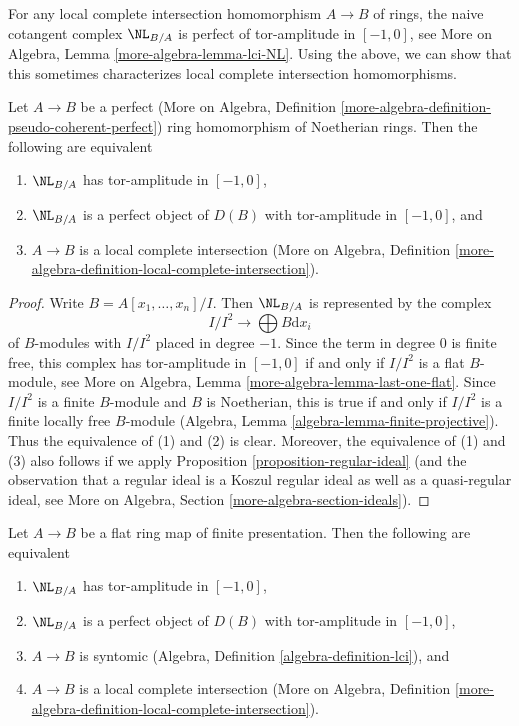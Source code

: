 \noindent
For any local complete intersection homomorphism $A \to B$
of rings, the naive cotangent complex $\NL_{B/A}$ is perfect
of tor-amplitude in $[-1, 0]$, see
More on Algebra, Lemma \ref{more-algebra-lemma-lci-NL}.
Using the above, we can show that this sometimes
characterizes local complete intersection homomorphisms.

\begin{lemma}
\label{lemma-perfect-NL-lci}
Let $A \to B$ be a perfect (More on Algebra, Definition
\ref{more-algebra-definition-pseudo-coherent-perfect})
ring homomorphism of Noetherian rings. Then the following are equivalent
\begin{enumerate}
\item $\NL_{B/A}$ has tor-amplitude in $[-1, 0]$,
\item $\NL_{B/A}$ is a perfect object of $D(B)$
with tor-amplitude in $[-1, 0]$, and
\item $A \to B$ is a local complete intersection
(More on Algebra, Definition
\ref{more-algebra-definition-local-complete-intersection}).
\end{enumerate}
\end{lemma}

\begin{proof}
Write $B = A[x_1, \ldots, x_n]/I$. Then $\NL_{B/A}$ is represented by
the complex
$$
I/I^2 \longrightarrow \bigoplus B \text{d}x_i
$$
of $B$-modules with $I/I^2$ placed in degree $-1$. Since the term in
degree $0$ is finite free, this complex has tor-amplitude in $[-1, 0]$ if and
only if $I/I^2$ is a flat $B$-module, see
More on Algebra, Lemma \ref{more-algebra-lemma-last-one-flat}.
Since $I/I^2$ is a finite $B$-module and $B$ is Noetherian, this is true
if and only if $I/I^2$ is a finite locally free $B$-module
(Algebra, Lemma \ref{algebra-lemma-finite-projective}).
Thus the equivalence of (1) and (2) is clear. Moreover, the equivalence
of (1) and (3) also follows if we apply
Proposition \ref{proposition-regular-ideal}
(and the observation that a regular ideal is a Koszul regular
ideal as well as a quasi-regular ideal, see
More on Algebra, Section \ref{more-algebra-section-ideals}).
\end{proof}

\begin{lemma}
\label{lemma-flat-fp-NL-lci}
Let $A \to B$ be a flat ring map of finite presentation.
Then the following are equivalent
\begin{enumerate}
\item $\NL_{B/A}$ has tor-amplitude in $[-1, 0]$,
\item $\NL_{B/A}$ is a perfect object of $D(B)$
with tor-amplitude in $[-1, 0]$,
\item $A \to B$ is syntomic
(Algebra, Definition \ref{algebra-definition-lci}), and
\item $A \to B$ is a local complete intersection
(More on Algebra, Definition
\ref{more-algebra-definition-local-complete-intersection}).
\end{enumerate}
\end{lemma}

